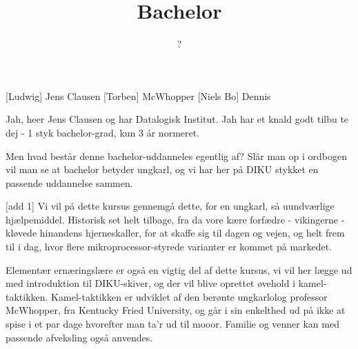 \documentclass[a4paper,11pt]{article}
\title{Bachelor}
\author{?}
\begin{document}
\maketitle

\begin{roles}
  [Ludwig] Jens Clausen
  [Torben] McWhopper
  [Niels Bo] Dennis
\end{roles}

\begin{sketch}


   Jah, heer Jens Clausen og har Datalogisk Institut.  Jah
  har et knald godt tilbu te dej - 1 styk bachelor-grad, kun 3 år
  normeret.


   Men hvad består denne bachelor-uddanneles egentlig af?
  Slår man op i ordbogen vil man se at bachelor betyder ungkarl, og vi
  har her på DIKU stykket en passende uddannelse sammen.


  [add 1] Vi vil på dette kursus gennemgå dette, for
  en ungkarl, så uundværlige hjælpemiddel.  Historisk set helt
  tilbage, fra da vore kære forfædre - vikingerne - kløvede hinandens
  hjerneskaller, for at skaffe sig til dagen og vejen, og helt frem
  til i dag, hvor flere mikroprocessor-styrede varianter er kommet på
  markedet.

  Elementær ernæringslære er også en vigtig del af dette kursus, vi
  vil her lægge ud med introduktion til DIKU-skiver, og der vil blive
  oprettet øvehold i kamel-taktikken.  Kamel-taktikken er udviklet af
  den berønte ungkarlolog professor McWhopper, fra Kentucky Fried
  University, og går i sin enkelthed ud på ikke at spise i et par dage
  hvorefter man ta'r ud til mooor.  Familie og venner kan med passende
  afveksling også anvendes.


\end{sketch}
\end{document}
